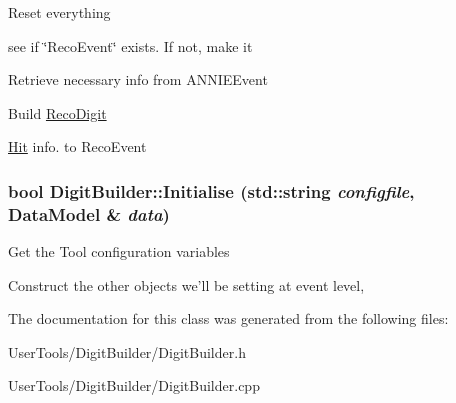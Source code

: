Reset everything

see if \char`\"{}RecoEvent\char`\"{} exists. If not, make it

Retrieve necessary info from ANNIEEvent

Build \hyperlink{classRecoDigit}{RecoDigit}

\hyperlink{classHit}{Hit} info. to RecoEvent \hypertarget{classDigitBuilder_aacb1cb36e5063ba4774381012ac148d6}{
\subsubsection[{Initialise}]{\setlength{\rightskip}{0pt plus 5cm}bool DigitBuilder::Initialise (std::string {\em configfile}, \/  {\bf DataModel} \& {\em data})}}
\label{classDigitBuilder_aacb1cb36e5063ba4774381012ac148d6}


Get the Tool configuration variables

Construct the other objects we'll be setting at event level, 

The documentation for this class was generated from the following files:\begin{DoxyCompactItemize}
\item 
UserTools/DigitBuilder/DigitBuilder.h\item 
UserTools/DigitBuilder/DigitBuilder.cpp\end{DoxyCompactItemize}
